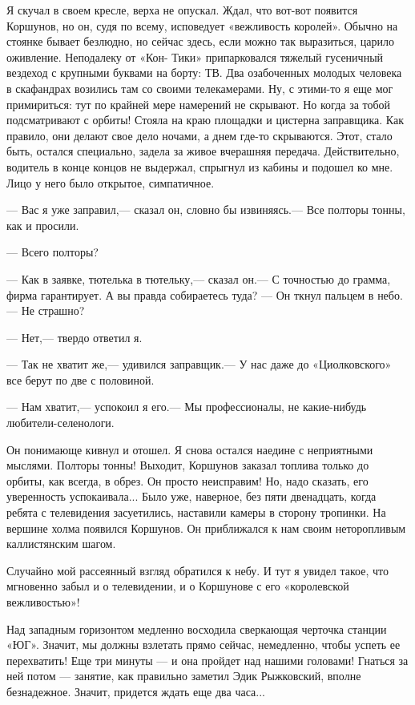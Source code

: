 \documentclass[11pt,a4paper,oneside]{article}
\begin{document}
Я скучал в своем кресле, верха не опускал. Ждал, что вот-вот появится Коршунов, но он, судя по всему, исповедует «вежливость королей». Обычно на стоянке бывает безлюдно, но сейчас здесь, если можно так выразиться, царило оживление. Неподалеку от «Кон- Тики» припарковался тяжелый гусеничный вездеход с крупными буквами на борту: ТВ. Два озабоченных молодых человека в скафандрах возились там со своими телекамерами. Ну, с этими-то я еще мог примириться: тут по крайней мере намерений не скрывают. Но когда за тобой подсматривают с орбиты! Стояла на краю площадки и цистерна заправщика. Как правило, они делают свое дело ночами, а днем где-то скрываются. Этот, стало быть, остался специально, задела за живое вчерашняя передача. Действительно, водитель в конце концов не выдержал, спрыгнул из кабины и подошел ко мне. Лицо у него было открытое, симпатичное.

— Вас я уже заправил,— сказал он, словно бы извиняясь.— Все полторы тонны, как и просили.

— Всего полторы?

— Как в заявке, тютелька в тютельку,— сказал он.— С точностью до грамма, фирма гарантирует. А вы правда собираетесь туда? — Он ткнул пальцем в небо.— Не страшно?

— Нет,— твердо ответил я.

— Так не хватит же,— удивился заправщик.— У нас даже до «Циолковского» все берут по две с половиной.

— Нам хватит,— успокоил я его.— Мы профессионалы, не какие-нибудь любители-селенологи.

Он понимающе кивнул и отошел. Я снова остался наедине с неприятными мыслями. Полторы тонны! Выходит, Коршунов заказал топлива только до орбиты, как всегда, в обрез. Он просто неисправим! Но, надо сказать, его уверенность успокаивала... Было уже, наверное, без пяти двенадцать, когда ребята с телевидения засуетились, наставили камеры в сторону тропинки. На вершине холма появился Коршунов. Он приближался к нам своим неторопливым каллистянским шагом.

Случайно мой рассеянный взгляд обратился к небу. И тут я увидел такое, что мгновенно забыл и о телевидении, и о Коршунове с его «королевской вежливостью»!

Над западным горизонтом медленно восходила сверкающая черточка станции «ЮГ». Значит, мы должны взлетать прямо сейчас, немедленно, чтобы успеть ее перехватить! Еще три минуты — и она пройдет над нашими головами! Гнаться за ней потом — занятие, как правильно заметил Эдик Рыжковский, вполне безнадежное. Значит, придется ждать еще два часа...
\end{document}
